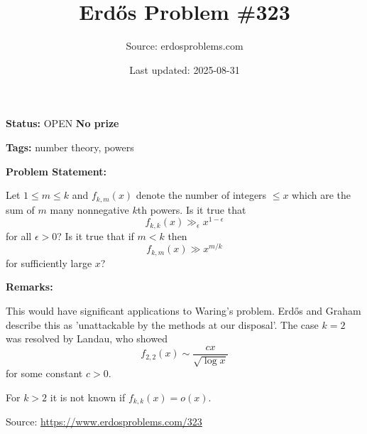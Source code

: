 \documentclass{article}
\title{Erd\H{o}s Problem \#323}
\date{Last updated: 2025-08-31}
\author{Source: erdosproblems.com}
\begin{document}
\maketitle

\noindent\textbf{Status:} OPEN \quad \textbf{No prize}

\noindent\textbf{Tags:} number theory, powers

\medskip
\noindent\textbf{Problem Statement:}

Let $1\leq m\leq k$ and $f_{k,m}(x)$ denote the number of integers $\leq x$ which are the sum of $m$ many nonnegative $k$th powers. Is it true that\[f_{k,k}(x) \gg_\epsilon x^{1-\epsilon}\]for all $\epsilon>0$? Is it true that if $m<k$ then\[f_{k,m}(x) \gg x^{m/k}\]for sufficiently large $x$?

\bigskip
\noindent\textbf{Remarks:}

This would have significant applications to Waring's problem. Erd\H{o}s and Graham describe this as 'unattackable by the methods at our disposal'. The case $k=2$ was resolved by Landau, who showed\[f_{2,2}(x) \sim \frac{cx}{\sqrt{\log x}}\]for some constant $c>0$.

For $k>2$ it is not known if $f_{k,k}(x)=o(x)$.

\bigskip
\noindent\small{Source: \url{https://www.erdosproblems.com/323}}
\end{document}
